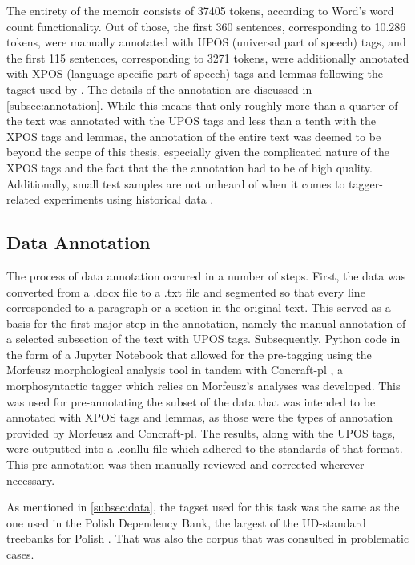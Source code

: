 The entirety of the memoir consists of 37405 tokens, according to Word's word count functionality. Out of those, the first 360 sentences, corresponding to 10.286 tokens, were manually annotated with UPOS (universal part of speech) tags, and the first 115 sentences, corresponding to 3271 tokens, were additionally annotated with XPOS (language-specific part of speech) tags and lemmas following the tagset used by \citet{wroblewska-2018-extended}. The details of the annotation are discussed in \autoref{subsec:annotation}. While this means that only roughly more than a quarter of the text was annotated with the UPOS tags and less than a tenth with the XPOS tags and lemmas, the annotation of the entire text was deemed to be beyond the scope of this thesis, especially given the complicated nature of the XPOS tags and the fact that the the annotation had to be of high quality. Additionally, small test samples are not unheard of when it comes to tagger-related experiments using historical data \citep{bollmann-2013-pos, hupkes16, rayson07}.

\subsection{Data Annotation}
\label{subsec:annotation}

The process of data annotation occured in a number of steps. First, the data was converted from a .docx file to a .txt file and segmented so that every line corresponded to a paragraph or a section in the original text. This served as a basis for the first major step in the annotation, namely the manual annotation of a selected subsection of the text with UPOS tags. Subsequently, Python code in the form of a Jupyter Notebook that allowed for the pre-tagging using the Morfeusz morphological analysis tool \citep{kie:wol:17:morf} in tandem with Concraft-pl \citep{waszczuk-2012-harnessing, waszczuk2018morphosyntactic}, a morphosyntactic tagger which relies on Morfeusz's analyses was developed. This was used for pre-annotating the subset of the data that was intended to be annotated with XPOS tags and lemmas, as those were the types of annotation provided by Morfeusz and Concraft-pl. The results, along with the UPOS tags, were outputted into a .conllu file which adhered to the standards of that format. This pre-annotation was then manually reviewed and corrected wherever necessary.

As mentioned in \autoref{subsec:data}, the tagset used for this task was the same as the one used in the Polish Dependency Bank, the largest of the UD-standard treebanks for Polish \citep{wroblewska-2018-extended}. That was also the corpus that was consulted in problematic cases. 

